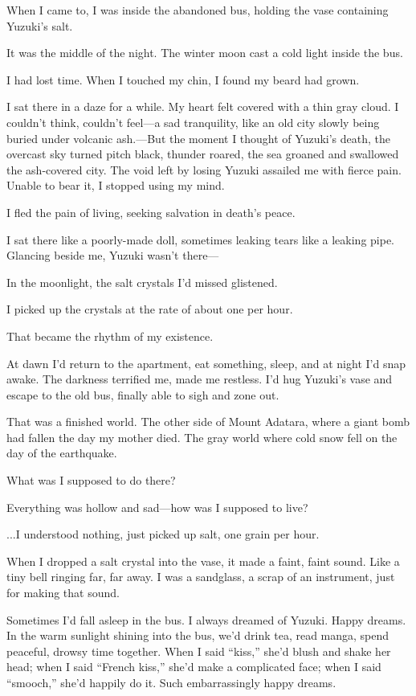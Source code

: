 \documentclass[
    a4paper,
    12pt,
    twoside,
    openany,
    UTF8,
    fontset=windows
]{ctexbook}
\begin{document}
When I came to, I was inside the abandoned bus, holding the vase containing Yuzuki's salt.

It was the middle of the night. The winter moon cast a cold light inside the bus.

I had lost time. When I touched my chin, I found my beard had grown.

I sat there in a daze for a while. My heart felt covered with a thin gray cloud. I couldn't think, couldn't feel---a sad tranquility, like an old city slowly being buried under volcanic ash.---But the moment I thought of Yuzuki's death, the overcast sky turned pitch black, thunder roared, the sea groaned and swallowed the ash-covered city. The void left by losing Yuzuki assailed me with fierce pain. Unable to bear it, I stopped using my mind.

I fled the pain of living, seeking salvation in death's peace.

I sat there like a poorly-made doll, sometimes leaking tears like a leaking pipe. Glancing beside me, Yuzuki wasn't there---

In the moonlight, the salt crystals I'd missed glistened.

I picked up the crystals at the rate of about one per hour.

That became the rhythm of my existence.

At dawn I'd return to the apartment, eat something, sleep, and at night I'd snap awake. The darkness terrified me, made me restless. I'd hug Yuzuki's vase and escape to the old bus, finally able to sigh and zone out.

That was a finished world. The other side of Mount Adatara, where a giant bomb had fallen the day my mother died. The gray world where cold snow fell on the day of the earthquake.

What was I supposed to do there?

Everything was hollow and sad---how was I supposed to live?

...I understood nothing, just picked up salt, one grain per hour.

When I dropped a salt crystal into the vase, it made a faint, faint sound. Like a tiny bell ringing far, far away. I was a sandglass, a scrap of an instrument, just for making that sound.

Sometimes I'd fall asleep in the bus. I always dreamed of Yuzuki. Happy dreams. In the warm sunlight shining into the bus, we'd drink tea, read manga, spend peaceful, drowsy time together. When I said ``kiss,'' she'd blush and shake her head; when I said ``French kiss,'' she'd make a complicated face; when I said ``smooch,'' she'd happily do it. Such embarrassingly happy dreams.
\end{document}
